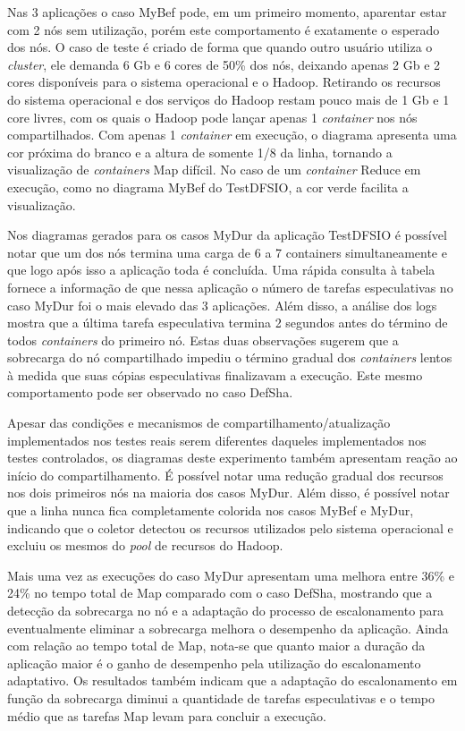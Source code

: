 Nas 3 aplicações o caso MyBef pode, em um primeiro momento, aparentar estar com 2 nós sem utilização, porém este comportamento é exatamente o esperado dos nós. O caso de teste é criado de forma que quando outro usuário utiliza o \textit{cluster}, ele demanda 6 Gb e 6 cores de 50\% dos nós, deixando apenas 2 Gb e 2 cores disponíveis para o sistema operacional e o Hadoop. Retirando os recursos do sistema operacional e dos serviços do Hadoop restam pouco mais de 1 Gb e 1 core livres, com os quais o Hadoop pode lançar apenas 1 \textit{container} nos nós compartilhados. Com apenas 1 \textit{container} em execução, o diagrama apresenta uma cor próxima do branco e a altura de somente 1/8 da linha, tornando a visualização de \textit{containers} Map difícil. No caso de um \textit{container} Reduce em execução, como no diagrama MyBef do TestDFSIO, a cor verde facilita a visualização.

Nos diagramas gerados para os casos MyDur da aplicação TestDFSIO é possível notar que um dos nós termina uma carga de 6 a 7 containers simultaneamente e que logo após isso a aplicação toda é concluída. Uma rápida consulta à tabela fornece a informação de que nessa aplicação o número de tarefas especulativas no caso MyDur foi o mais elevado das 3 aplicações. Além disso, a análise dos logs mostra que a última tarefa especulativa termina 2 segundos antes do término de todos \textit{containers} do primeiro nó. Estas duas observações sugerem que a sobrecarga do nó compartilhado impediu o término gradual dos \textit{containers} lentos à medida que suas cópias especulativas finalizavam a execução. Este mesmo comportamento pode ser observado no caso DefSha.

Apesar das condições e mecanismos de compartilhamento/atualização implementados nos testes reais serem diferentes daqueles implementados nos testes controlados, os diagramas deste experimento também apresentam reação ao início do compartilhamento. É possível notar uma redução gradual dos recursos nos dois primeiros nós na maioria dos casos MyDur. Além disso, é possível notar que a linha nunca fica completamente colorida nos casos MyBef e MyDur, indicando que o coletor detectou os recursos utilizados pelo sistema operacional e excluiu os mesmos do \textit{pool} de recursos do Hadoop.

Mais uma vez as execuções do caso MyDur apresentam uma melhora entre 36\% e 24\% no tempo total de Map comparado com o caso DefSha, mostrando que a detecção da sobrecarga no nó e a adaptação do processo de escalonamento para eventualmente eliminar a sobrecarga melhora o desempenho da aplicação. Ainda com relação ao tempo total de Map, nota-se que quanto maior a duração da aplicação maior é o ganho de desempenho pela utilização do escalonamento adaptativo. Os resultados também indicam que a adaptação do escalonamento em função da sobrecarga diminui a quantidade de tarefas especulativas e o tempo médio que as tarefas Map levam para concluir a execução. 


